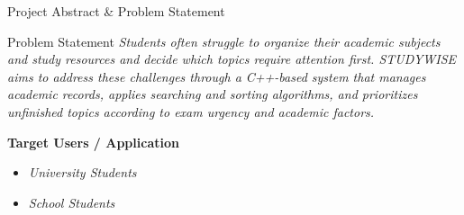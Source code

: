 \documentclass[aspectratio=169,11pt]{beamer}
\newcommand{\placeholder}[1]{%
\textit{\color{GEUGrey}#1}
}
\begin{document}
\begin{frame}{Project Abstract \& Problem Statement}
\vspace{-0.8cm}
\begin{block}{Problem Statement}
\placeholder{
Students often struggle to organize their academic subjects and study resources and decide which topics require attention first. STUDYWISE aims to address these challenges through a C++-based system that manages academic records, applies searching and sorting algorithms, and prioritizes unfinished topics according to exam urgency and academic factors.
}
\end{block}

\vspace{2mm}

\textbf{\color{GEUBlue}Target Users / Application}

\begin{itemize}\itemsep2pt
    \item \placeholder{University Students}
    \item \placeholder{School Students}
\end{itemize}


\end{frame}
\end{document}
